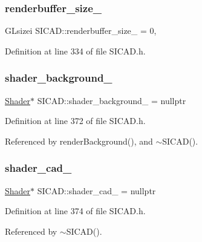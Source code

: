 \subsubsection{\texorpdfstring{renderbuffer\+\_\+size\+\_\+}{renderbuffer\_size\_}}
{\footnotesize\ttfamily G\+Lsizei S\+I\+C\+A\+D\+::renderbuffer\+\_\+size\+\_\+ = 0\hspace{0.3cm}{\ttfamily [static]}, {\ttfamily [private]}}



Definition at line 334 of file S\+I\+C\+A\+D.\+h.

\mbox{\label{classSICAD_a46edf33acc9f7ea3bd98c7ee6388ce9c}} 
\subsubsection{\texorpdfstring{shader\+\_\+background\+\_\+}{shader\_background\_}}
{\footnotesize\ttfamily \mbox{\hyperlink{classShader}{Shader}}$\ast$ S\+I\+C\+A\+D\+::shader\+\_\+background\+\_\+ = nullptr\hspace{0.3cm}{\ttfamily [private]}}



Definition at line 372 of file S\+I\+C\+A\+D.\+h.



Referenced by render\+Background(), and $\sim$\+S\+I\+C\+A\+D().

\mbox{\label{classSICAD_a6c11f0e8dc8cbdd91748c230fc680833}} 
\subsubsection{\texorpdfstring{shader\+\_\+cad\+\_\+}{shader\_cad\_}}
{\footnotesize\ttfamily \mbox{\hyperlink{classShader}{Shader}}$\ast$ S\+I\+C\+A\+D\+::shader\+\_\+cad\+\_\+ = nullptr\hspace{0.3cm}{\ttfamily [private]}}



Definition at line 374 of file S\+I\+C\+A\+D.\+h.



Referenced by $\sim$\+S\+I\+C\+A\+D().

